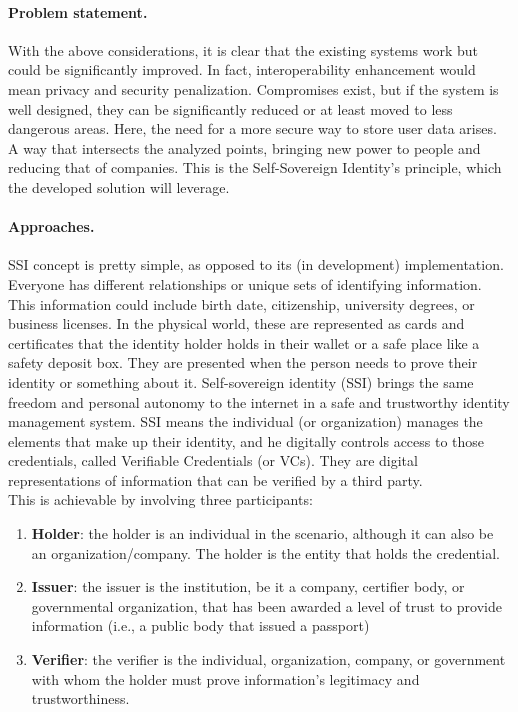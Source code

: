 \paragraph{Problem statement.} With the above considerations, it is clear that 
the existing systems work but could be significantly improved. In fact, 
interoperability enhancement would mean privacy and security penalization. 
Compromises exist, but if the system is well designed, they can be significantly 
reduced or at least moved to less dangerous areas. Here, the need for a more 
secure way to store user data arises. A way that intersects the analyzed points, 
bringing new power to people and reducing that of companies. This is the 
Self-Sovereign Identity's principle, which the developed solution will leverage.

\paragraph{Approaches.} SSI concept is pretty simple, as opposed to its 
(in development) implementation. Everyone has different relationships or 
unique sets of identifying information. This information could include 
birth date, citizenship, university degrees, or business licenses. In the 
physical world, these are represented as cards and certificates that the 
identity holder holds in their wallet or a safe place like a safety deposit 
box. They are presented when the person needs to prove their identity or 
something about it. Self-sovereign identity (SSI) brings the same freedom and 
personal autonomy to the internet in a safe and trustworthy identity management 
system. SSI means the individual (or organization) manages the elements that 
make up their identity, and he digitally controls access to those credentials,
called Verifiable Credentials (or VCs). They are digital representations of
information that can be verified by a third party.
\vspace*{0.3cm}\\
This is achievable by involving three participants:
\begin{enumerate}
    \item \textbf{Holder}: the holder is an individual in the scenario, 
    although it can also be an organization/company. The holder is the 
    entity that holds the credential.
    \item \textbf{Issuer}: the issuer is the institution, be it a company, 
    certifier body, or governmental organization, that has been awarded a 
    level of trust to provide information (i.e., a public body that issued 
    a passport)
    \item \textbf{Verifier}: the verifier is the individual, organization,
    company, or government with whom the holder must prove information's 
    legitimacy and trustworthiness.
\end{enumerate}
